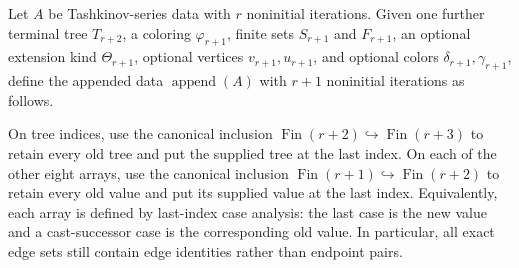 \begin{definition}
Let \(A\) be Tashkinov-series data with \(r\) noninitial iterations.  Given
one further terminal tree \(T_{r+2}\), a coloring \(\varphi_{r+1}\), finite
sets \(S_{r+1}\) and \(F_{r+1}\), an optional extension kind
\(\Theta_{r+1}\), optional vertices \(v_{r+1},u_{r+1}\), and optional colors
\(\delta_{r+1},\gamma_{r+1}\), define the appended data
\(\operatorname{append}(A)\) with \(r+1\) noninitial iterations as follows.

On tree indices, use the canonical inclusion
\(\operatorname{Fin}(r+2)\hookrightarrow\operatorname{Fin}(r+3)\) to retain
every old tree and put the supplied tree at the last index.  On each of the
other eight arrays, use the canonical inclusion
\(\operatorname{Fin}(r+1)\hookrightarrow\operatorname{Fin}(r+2)\) to retain
every old value and put its supplied value at the last index.  Equivalently,
each array is defined by last-index case analysis: the last case is the new
value and a cast-successor case is the corresponding old value.  In
particular, all exact edge sets still contain edge identities rather than
endpoint pairs.
\end{definition}
